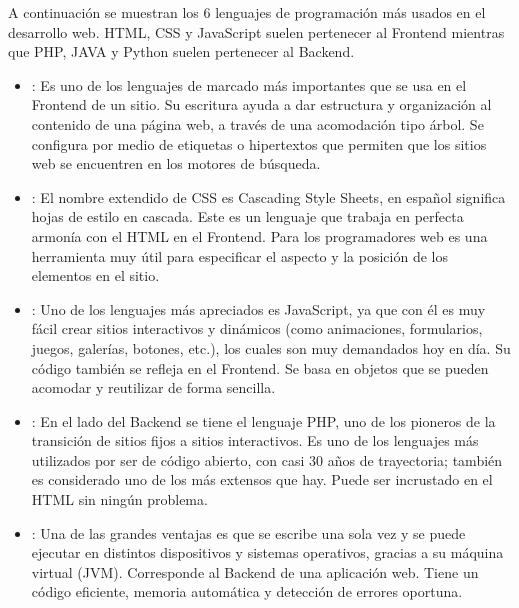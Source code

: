 \documentclass[letterpaper,10pt,spanish]{sphinxmanual}
\begin{document}
\sphinxAtStartPar
A continuación se muestran los 6 lenguajes de programación más usados en el desarrollo web. HTML, CSS y JavaScript suelen pertenecer al Front\sphinxhyphen{}end mientras que PHP, JAVA y Python suelen pertenecer al Back\sphinxhyphen{}end.
\begin{itemize}
\item {} 
\sphinxAtStartPar
{}: Es uno de los lenguajes de marcado más importantes que se usa en el Front\sphinxhyphen{}end de un sitio. Su escritura ayuda a dar estructura y organización al contenido de una página web, a través de una acomodación tipo árbol. Se configura por medio de etiquetas o hipertextos que permiten que los sitios web se encuentren en los motores de búsqueda.

\item {} 
\sphinxAtStartPar
{}: El nombre extendido de CSS es Cascading Style Sheets, en español significa hojas de estilo en cascada. Este es un lenguaje que trabaja en perfecta armonía con el HTML en el Front\sphinxhyphen{}end. Para los programadores web es una herramienta muy útil para especificar el aspecto y la posición de los elementos en el sitio.

\item {} 
\sphinxAtStartPar
{}: Uno de los lenguajes más apreciados es JavaScript, ya que con él es muy fácil crear sitios interactivos y dinámicos (como animaciones, formularios, juegos, galerías, botones, etc.), los cuales son muy demandados hoy en día. Su código también se refleja en el Front\sphinxhyphen{}end. Se basa en objetos que se pueden acomodar y reutilizar de forma sencilla.

\item {} 
\sphinxAtStartPar
{}: En el lado del Back\sphinxhyphen{}end se tiene el lenguaje PHP, uno de los pioneros de la transición de sitios fijos a sitios interactivos. Es uno de los lenguajes más utilizados por ser de código abierto, con casi 30 años de trayectoria; también es considerado uno de los más extensos que hay. Puede ser incrustado en el HTML sin ningún problema.

\item {} 
\sphinxAtStartPar
{}: Una de las grandes ventajas es que se escribe una sola vez y se puede ejecutar en distintos dispositivos y sistemas operativos, gracias a su máquina virtual (JVM). Corresponde al Back\sphinxhyphen{}end de una aplicación web. Tiene un código eficiente, memoria automática y detección de errores oportuna.


\end{itemize}
\end{document}
